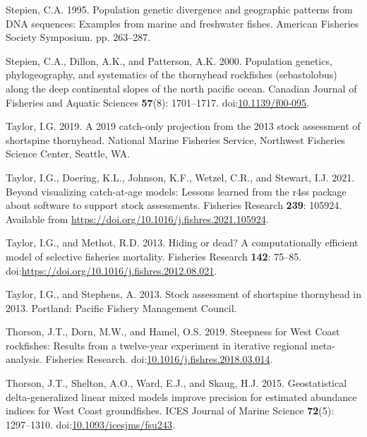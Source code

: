 \documentclass[11pt,
  letterpaper,
]{article}
\newlength{\cslhangindent}
\newenvironment{CSLReferences}[2] %
 {%
  \setlength{\parindent}{0pt}
  \ifodd #1 \everypar{\setlength{\hangindent}{\cslhangindent}}\ignorespaces\fi
  \ifnum #2 > 0
  \setlength{\parskip}{#2\baselineskip}
  \fi
 }%
 {}
\begin{document}
\begin{CSLReferences}{1}{0}
\leavevmode{}%
Stepien, C.A. 1995. Population genetic divergence and geographic patterns from DNA sequences: Examples from marine and freshwater fishes. American Fisheries Society Symposium. pp. 263--287.

\leavevmode{}%
Stepien, C.A., Dillon, A.K., and Patterson, A.K. 2000. Population genetics, phylogeography, and systematics of the thornyhead rockfishes (sebastolobus) along the deep continental slopes of the north pacific ocean. Canadian Journal of Fisheries and Aquatic Sciences \textbf{57}(8): 1701--1717. doi:\href{https://doi.org/10.1139/f00-095}{10.1139/f00-095}.

\leavevmode{}%
Taylor, I.G. 2019. A 2019 catch-only projection from the 2013 stock assessment of shortspine thornyhead. National Marine Fisheries Service, Northwest Fisheries Science Center, Seattle, {WA}.

\leavevmode{}%
Taylor, I.G., Doering, K.L., Johnson, K.F., Wetzel, C.R., and Stewart, I.J. 2021. Beyond visualizing catch-at-age models: Lessons learned from the r4ss package about software to support stock assessments. Fisheries Research \textbf{239}: 105924. Available from \url{https://doi.org/10.1016/j.fishres.2021.105924}.

\leavevmode{}%
Taylor, I.G., and Methot, R.D. 2013. Hiding or dead? A computationally efficient model of selective fisheries mortality. Fisheries Research \textbf{142}: 75--85. doi:\url{https://doi.org/10.1016/j.fishres.2012.08.021}.

\leavevmode{}%
Taylor, I.G., and Stephens, A. 2013. Stock assessment of shortspine thornyhead in 2013. Portland: Pacific Fishery Management Council.

\leavevmode{}%
Thorson, J.T., Dorn, M.W., and Hamel, O.S. 2019. Steepness for {West} {Coast} rockfishes: {Results} from a twelve-year experiment in iterative regional meta-analysis. Fisheries Research. doi:\href{https://doi.org/10.1016/j.fishres.2018.03.014}{10.1016/j.fishres.2018.03.014}.

\leavevmode{}%
Thorson, J.T., Shelton, A.O., Ward, E.J., and Skaug, H.J. 2015. {Geostatistical delta-generalized linear mixed models improve precision for estimated abundance indices for West Coast groundfishes}. ICES Journal of Marine Science \textbf{72}(5): 1297--1310. doi:\href{https://doi.org/10.1093/icesjms/fsu243}{10.1093/icesjms/fsu243}.


\end{CSLReferences}
\end{document}
